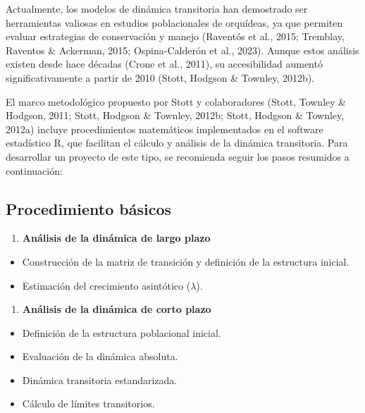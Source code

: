 \documentclass[
  12pt,
  letterpaper,
]{book}
\providecommand{\tightlist}{%
  \setlength{\itemsep}{0pt}\setlength{\parskip}{0pt}}\usepackage{longtable,booktabs,array}
\begin{document}
Actualmente, los modelos de dinámica transitoria han demostrado ser
herramientas valiosas en estudios poblacionales de orquídeas, ya que
permiten evaluar estrategias de conservación y manejo (Raventós et al.,
2015; Tremblay, Raventos \& Ackerman, 2015; Ospina-Calderón et al.,
2023). Aunque estos análisis existen desde hace décadas (Crone et al.,
2011), su accesibilidad aumentó significativamente a partir de 2010
(Stott, Hodgson \& Townley, 2012b).

El marco metodológico propuesto por Stott y colaboradores (Stott,
Townley \& Hodgson, 2011; Stott, Hodgson \& Townley, 2012b; Stott,
Hodgson \& Townley, 2012a) incluye procedimientos matemáticos
implementados en el software estadístico R, que facilitan el cálculo y
análisis de la dinámica transitoria. Para desarrollar un proyecto de
este tipo, se recomienda seguir los pasos resumidos a continuación:

\subsection{Procedimiento básicos}\label{procedimiento-buxe1sicos}

\begin{enumerate}
\def\labelenumi{\arabic{enumi})}
\tightlist
\item
  \textbf{Análisis de la dinámica de largo plazo}
\end{enumerate}

\begin{itemize}
\tightlist
\item
  Construcción de la matriz de transición y definición de la estructura
  inicial.
\item
  Estimación del crecimiento asintótico (\(λ\)).
\end{itemize}

\begin{enumerate}
\def\labelenumi{\arabic{enumi})}
\setcounter{enumi}{1}
\tightlist
\item
  \textbf{Análisis de la dinámica de corto plazo}
\end{enumerate}

\begin{itemize}
\tightlist
\item
  Definición de la estructura poblacional inicial.
\item
  Evaluación de la dinámica absoluta.
\item
  Dinámica transitoria estandarizada.
\item
  Cálculo de límites transitorios.
\end{itemize}
\end{document}
